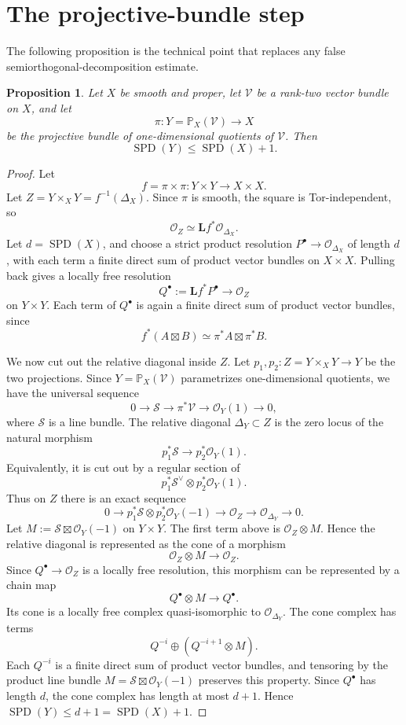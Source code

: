\documentclass[11pt]{amsart}
\numberwithin{equation}{section}
\newtheorem{proposition}[theorem]{Proposition}
\theoremstyle{definition}
\DeclareMathOperator{\SPD}{SPD}
\begin{document}
\section{The projective-bundle step}

The following proposition is the technical point that replaces any false semiorthogonal-decomposition estimate.

\begin{proposition}
Let $X$ be smooth and proper, let $\mathcal V$ be a rank-two vector bundle on $X$, and let
\[
\pi:Y=\mathbb P_X(\mathcal V)\to X
\]
be the projective bundle of one-dimensional quotients of $\mathcal V$. Then
\[
\SPD(Y)\le \SPD(X)+1.
\]
\end{proposition}

\begin{proof}
Let
\[
f=\pi\times\pi:Y\times Y\to X\times X.
\]
Let $Z=Y\times_XY=f^{-1}(\Delta_X)$. Since $\pi$ is smooth, the square is Tor-independent, so
\[
\mathcal O_Z\simeq \mathbf L f^*\mathcal O_{\Delta_X}.
\]
Let $d=\SPD(X)$, and choose a strict product resolution $P^\bullet\to\mathcal O_{\Delta_X}$ of length $d$, with each term a finite direct sum of product vector bundles on $X\times X$. Pulling back gives a locally free resolution
\[
Q^\bullet:=\mathbf L f^*P^\bullet\to\mathcal O_Z
\]
on $Y\times Y$. Each term of $Q^\bullet$ is again a finite direct sum of product vector bundles, since
\[
f^*(A\boxtimes B)\simeq \pi^*A\boxtimes \pi^*B.
\]

We now cut out the relative diagonal inside $Z$. Let $p_1,p_2:Z=Y\times_XY\to Y$ be the two projections. Since $Y=\mathbb P_X(\mathcal V)$ parametrizes one-dimensional quotients, we have the universal sequence
\[
0\to \mathcal S\to \pi^*\mathcal V\to \mathcal O_Y(1)\to0,
\]
where $\mathcal S$ is a line bundle. The relative diagonal $\Delta_Y\subset Z$ is the zero locus of the natural morphism
\[
p_1^*\mathcal S\longrightarrow p_2^*\mathcal O_Y(1).
\]
Equivalently, it is cut out by a regular section of
\[
p_1^*\mathcal S^\vee\otimes p_2^*\mathcal O_Y(1).
\]
Thus on $Z$ there is an exact sequence
\[
0\to
p_1^*\mathcal S\otimes p_2^*\mathcal O_Y(-1)
\longrightarrow
\mathcal O_Z
\longrightarrow
\mathcal O_{\Delta_Y}
\to0.
\]
Let $M:=\mathcal S\boxtimes \mathcal O_Y(-1)$ on $Y\times Y$. The first term above is $\mathcal O_Z\otimes M$. Hence the relative diagonal is represented as the cone of a morphism
\[
\mathcal O_Z\otimes M\longrightarrow \mathcal O_Z.
\]
Since $Q^\bullet\to\mathcal O_Z$ is a locally free resolution, this morphism can be represented by a chain map
\[
Q^\bullet\otimes M\longrightarrow Q^\bullet.
\]
Its cone is a locally free complex quasi-isomorphic to $\mathcal O_{\Delta_Y}$. The cone complex has terms
\[
Q^{-i}\oplus (Q^{-i+1}\otimes M).
\]
Each $Q^{-i}$ is a finite direct sum of product vector bundles, and tensoring by the product line bundle $M=\mathcal S\boxtimes\mathcal O_Y(-1)$ preserves this property. Since $Q^\bullet$ has length $d$, the cone complex has length at most $d+1$. Hence $\SPD(Y)\le d+1=\SPD(X)+1$.
\end{proof}
\end{document}
